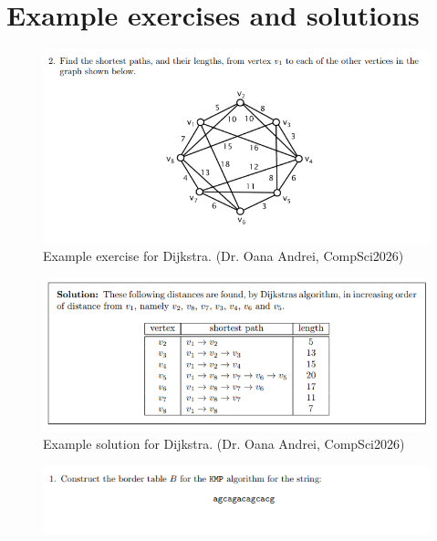 \documentclass{l4proj}
\begin{document}
\begin{appendices}
\label{chap:appendices}
\chapter{Example exercises and solutions}

\begin{figure}[h]
    \centering
    \includegraphics[width=0.9\linewidth]{images/dijkstra_example_exercise}    

    \caption{Example exercise for Dijkstra. (Dr. Oana Andrei, CompSci2026)}
    \label{fig:dijkstra_example_exercise} 
\end{figure}

\begin{figure}[h]
    \centering
    \includegraphics[width=0.9\linewidth]{images/dijkstra_example_solution}    

    \caption{Example solution for Dijkstra. (Dr. Oana Andrei, CompSci2026)}
    \label{fig:dijkstra_example_solution} 
\end{figure}

\begin{figure}[h]
    \centering
    \includegraphics[width=0.9\linewidth]{images/kmp_example_exercise}    


\end{figure}
\end{appendices}
\end{document}
